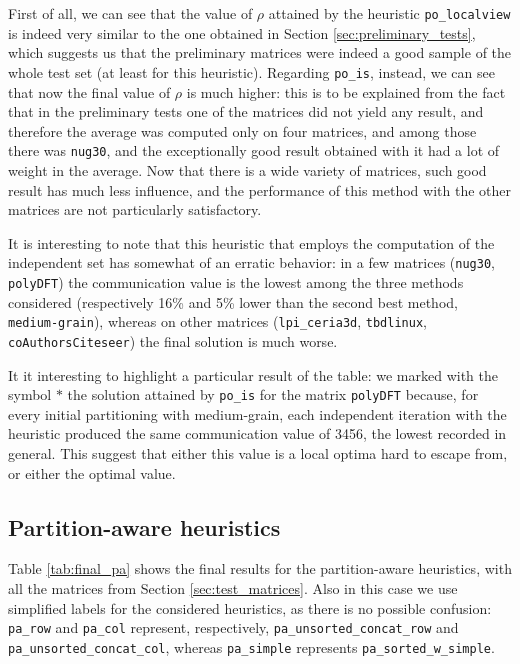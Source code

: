 First of all, we can see that the value of $\rho$ attained by the heuristic \verb|po_localview| is indeed very similar to the one obtained in Section \ref{sec:preliminary_tests}, which suggests us that the preliminary matrices were indeed a good sample of the whole test set (at least for this heuristic). Regarding \verb|po_is|, instead, we can see that now the final value of $\rho$ is much higher: this is to be explained from the fact that in the preliminary tests one of the matrices did not yield any result, and therefore the average was computed only on four matrices, and among those there was \verb|nug30|, and the exceptionally good result obtained with it had a lot of weight in the average. Now that there is a wide variety of matrices, such good result has much less influence, and the performance of this method with the other matrices are not particularly satisfactory.

It is interesting to note that this heuristic that employs the computation of the independent set has somewhat of an erratic behavior: in a few matrices (\verb|nug30|, \verb|polyDFT|) the communication value is the lowest among the three methods considered (respectively 16\% and 5\% lower than the second best method, \verb|medium-grain|), whereas on other matrices (\verb|lpi_ceria3d|, \verb|tbdlinux|, \verb|coAuthorsCiteseer|) the final solution is much worse.

It it interesting to highlight a particular result of the table: we marked with the symbol $*$ the solution attained by \verb|po_is| for the matrix \verb|polyDFT| because, for every initial partitioning with medium-grain, each independent iteration with the heuristic produced the same communication value of 3456, the lowest recorded in general. This suggest that either this value is a local optima hard to escape from, or either the optimal value.

\subsection{Partition-aware heuristics}

Table \ref{tab:final_pa} shows the final results for the partition-aware heuristics, with all the matrices from Section \ref{sec:test_matrices}. Also in this case we use simplified labels for the considered heuristics, as there is no possible confusion: \verb|pa_row| and \verb|pa_col| represent, respectively, \verb|pa_unsorted_concat_row| and \verb|pa_unsorted_concat_col|, whereas \verb|pa_simple| represents \verb|pa_sorted_w_simple|.


